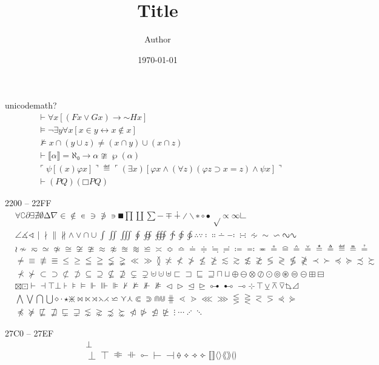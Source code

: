 \documentclass[twoside, 10pt]{article}
\title{Title}
\author{Author}
\date{\today}
\begin{document}
        unicodemath?
        \begin{align}
            & ⊢ ∀x[(Fx ∨ Gx) → \mathord{∼}Hx] \\
            & ⊨ ¬∃y∀x[x∈y ↔ x∉x]  \\
            & ⊭ x ∩ (y ∪ z) ≠ (x ∩ y) ∪ (x ∩ z) \\
            & ⊢ ⟦α⟧ = ℵ₀ → α ≇ ℘(α) \\
            & ⌜ψ[( x)φx]⌝ ≝      ⌜(∃x)[φx ∧ (∀z)(φz ⊃ x=z) ∧ ψx]⌝ \\
            & ⊢ (P  Q)  (□P   Q)
        \end{align}

        2200 -- 22FF
        \begin{align}
            & ∀ ∁ ∂ ∃ ∄ ∅ ∆ ∇ ∈ ∉ ∊ ∋ ∌ ∍ ∎ ∏ ∐ ∑ − ∓ ∔ ∕ ∖ ∗ ∘ ∙ √ ∝ ∞ ∟ \\
            & ∠ ∡ ∢ ∣ ∤ ∥ ∦ ∧ ∨ ∩ ∪ ∫ ∬ ∭ ∮ ∯ ∰ ∱ ∲ ∳ ∴ ∵ ∶ ∷ ∸ ∹ ∺ ∻ ∼ ∽ ∾ ∿ \\
            & ≀ ≁ ≂ ≃ ≄ ≅ ≆ ≇ ≈ ≉ ≊ ≋ ≌ ≍ ≎ ≏ ≐ ≑ ≒ ≓ ≔ ≕ ≖ ≗ ≘ ≙ ≚ ≛ ≜ ≝ ≞ ≟ \\
            & ≠ ≡ ≢ ≣ ≤ ≥ ≦ ≧ ≨ ≩ ≪ ≫ ≬ ≭ ≮ ≯ ≰ ≱ ≲ ≳ ≴ ≵ ≶ ≷ ≸ ≹ ≺ ≻ ≼ ≽ ≾ ≿ \\
            & ⊀ ⊁ ⊂ ⊃ ⊄ ⊅ ⊆ ⊇ ⊈ ⊉ ⊊ ⊋ ⊌ ⊍ ⊎ ⊏ ⊐ ⊑ ⊒ ⊓ ⊔ ⊕ ⊖ ⊗ ⊘ ⊙ ⊚ ⊛ ⊜ ⊝ ⊞ ⊟ \\
            & ⊠ ⊡ ⊢ ⊣ ⊤ ⊥ ⊦ ⊧ ⊨ ⊩ ⊪ ⊫ ⊬ ⊭ ⊮ ⊯ ⊲ ⊳ ⊴ ⊵ ⊶ ⊷ ⊸ ⊹ ⊺ ⊻ ⊼ ⊽ ⊾ ⊿ \\
            & ⋀ ⋁ ⋂ ⋃ ⋄ ⋅ ⋆ ⋇ ⋈ ⋉ ⋊ ⋋ ⋌ ⋍ ⋎ ⋏ ⋐ ⋑ ⋒ ⋓ ⋕ ⋖ ⋗ ⋘ ⋙ ⋚ ⋛ ⋜ ⋝ ⋞ ⋟ \\
            & ⋠ ⋡ ⋢ ⋣ ⋤ ⋥ ⋦ ⋧ ⋨ ⋩ ⋪ ⋫ ⋬ ⋭ ⋮ ⋯ ⋰ ⋱
        \end{align}

        27C0 -- 27EF
        \begin{align}
            & ⟂ \\
            & ⟘ ⟙ ⟚ ⟛ ⟜ ⟝ ⟞ ⟠ ⟡ ⟢ ⟣ ⟦ ⟧ ⟨ ⟩ ⟪ ⟫ ⟮ ⟯
        \end{align}
\end{document}

